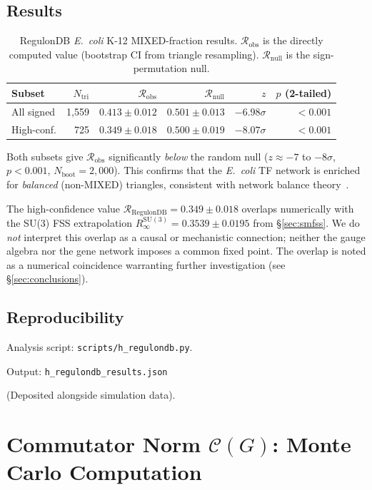 \documentclass[12pt,a4paper]{article}
\newcommand{\R}{\mathcal{R}}           %
\newcommand{\SU}[1]{\mathrm{SU}(#1)}
\theoremstyle{plain}
\theoremstyle{definition}
\theoremstyle{remark}
\begin{document}
\subsection*{Results}

\begin{table}[H]
\centering
\caption{RegulonDB \textit{E.~coli} K-12 MIXED-fraction results.
  $\R_\text{obs}$ is the directly computed value (bootstrap CI from triangle
  resampling). $\R_\text{null}$ is the sign-permutation null.}
\label{tab:regulondb}
\small
\begin{tabular}{lrrrrr}
\toprule
Subset & $N_\text{tri}$ & $\R_\text{obs}$ & $\R_\text{null}$ & $z$ & $p$ (2-tailed) \\
\midrule
All signed       & 1{,}559 & $0.413\pm0.012$ & $0.501\pm0.013$ & $-6.98\sigma$ & $<0.001$ \\
High-conf.       &   725   & $0.349\pm0.018$ & $0.500\pm0.019$ & $-8.07\sigma$ & $<0.001$ \\
\bottomrule
\end{tabular}
\end{table}

Both subsets give $\R_\text{obs}$ significantly \emph{below} the random null
($z\approx{-7}$ to $-8\sigma$, $p<0.001$, $N_\text{boot}=2{,}000$).
This confirms that the \textit{E.~coli} TF network is enriched for
\emph{balanced} (non-MIXED) triangles, consistent with network balance
theory~\citep{Alon2007}.

The high-confidence value $\R_\text{RegulonDB}=0.349\pm0.018$ overlaps
numerically with the SU(3) FSS extrapolation
$R_\infty^{\SU{3}}=0.3539\pm0.0195$ from \S\ref{sec:smfss}.
We do \emph{not} interpret this overlap as a causal or mechanistic connection;
neither the gauge algebra nor the gene network imposes a common fixed point.
The overlap is noted as a numerical coincidence warranting further
investigation (see \S\ref{sec:conclusions}).

\subsection*{Reproducibility}

Analysis script: \texttt{scripts/h\_regulondb.py}.

Output: \texttt{h\_regulondb\_results.json} 

(Deposited alongside simulation data).

\section{Commutator Norm $\mathcal{C}(G)$: Monte Carlo Computation}
\label{app:commutator}
\end{document}
